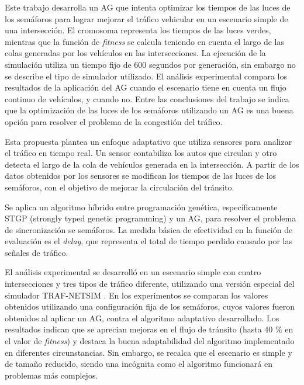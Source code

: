 \begin{itemize}
\begin{item}
Este trabajo desarrolla un AG que intenta optimizar los tiempos de las luces de los semáforos para lograr mejorar el tráfico vehicular en un escenario simple de una intersección. El cromosoma representa los tiempos de las luces verdes, mientras que la función de \emph{fitness} se calcula teniendo en cuenta el largo de las colas generadas por los vehículos en las intersecciones. La ejecución de la simulación utiliza un tiempo fijo de 600 segundos por generación, sin embargo no se describe el tipo de simulador utilizado. El análisis experimental compara los resultados de la aplicación del AG cuando el escenario tiene en cuenta un flujo continuo de vehículos, y cuando no. Entre las conclusiones del trabajo se indica que la optimización de las luces de los semáforos utilizando un AG es una buena opción para resolver el problema de la congestión del tráfico.	
\end{item}	


\begin{item}

Esta propuesta plantea un enfoque adaptativo que utiliza sensores para analizar el tráfico en tiempo real. Un sensor contabiliza los autos que circulan y otro detecta el largo de la cola de vehículos generada en la intersección. A partir de los datos obtenidos por los sensores se modifican los tiempos de las luces de los semáforos, con el objetivo de mejorar la circulación del tránsito. 

Se aplica un algoritmo híbrido entre programación genética, específicamente STGP (strongly typed genetic programming) \citep{Montana1995} y un AG, para resolver el problema de sincronización se semáforos. La medida básica de efectividad en la función de evaluación es el \emph{delay}, que representa el total de tiempo perdido causado por las señales de tráfico. 

El análisis experimental se desarrolló en un escenario simple con cuatro intersecciones y tres tipos de tráfico diferente, utilizando una versión especial del simulador TRAF-NETSIM \citep{TRAF-NETSIM}. En los experimentos se comparan los valores obtenidos utilizando una configuración fija de los semáforos, cuyos valores fueron obtenidos al aplicar un AG, contra el algoritmo adaptativo desarrollado. Los resultados indican que se aprecian mejoras en el flujo de tránsito (hasta 40 \% en el valor de \emph{fitness})  y destaca la buena adaptabilidad del algoritmo implementado en diferentes circunstancias. Sin embargo, se recalca que el escenario es simple y de tamaño reducido, siendo una incógnita como el algoritmo funcionará en problemas más complejos.


\end{item}
\end{itemize}
